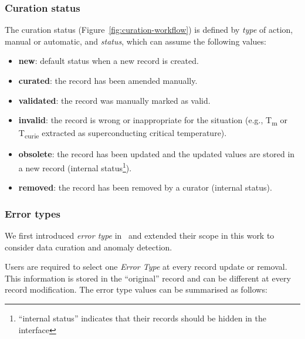\subsubsection{Curation status} 
\label{subsec:curation-status}
The curation status (Figure~\ref{fig:curation-workflow}) is defined by \emph{type} of action, manual or automatic, and \emph{status}, which can assume the following values: 
\begin{itemize}
    \item \textbf{new}: default status when a new record is created.
    \item \textbf{curated}: the record has been amended manually.
    \item \textbf{validated}: the record was manually marked as valid.
    \item \textbf{invalid}: the record is wrong or inappropriate for the situation (e.g., T\textsubscript{m} or T\textsubscript{curie} extracted as superconducting critical temperature).
    \item \textbf{obsolete}: the record has been updated and the updated values are stored in a new record (internal status\footnote{``internal status'' indicates that their records should be hidden in the interface}).
    \item \textbf{removed}: the record has been removed by a curator (internal status).
\end{itemize} 
    


\subsubsection{Error types}
\label{subsec:error-types}
We first introduced \emph{error type} in~\cite{foppiano2023automatic} and extended their scope in this work to consider data curation and anomaly detection. 

Users are required to select one \emph{Error Type} at every record update or removal. This information is stored in the ``original'' record and can be different at every record modification.
The error type values can be summarised as follows: 

